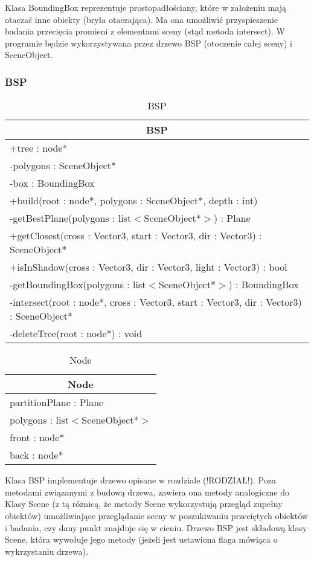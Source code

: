 Klasa BoundingBox reprezentuje prostopadłościany, które w założeniu mają otaczać inne obiekty (bryła otaczająca). Ma ona umożliwić przyspieszenie badania przecięcia promieni z elementami sceny (stąd metoda intersect). W programie będzie wykorzystywana przez drzewo BSP (otoczenie całej sceny) i SceneObject. 


\subsubsection{BSP}

\footnotesize
\begin{longtable}{|p{14cm}|}
	\caption{BSP} \label{tab:BSP} \\ \hline
	\multicolumn{1}{|c|}{BSP} \\ \hline
    +tree : node* \\
    -polygons : SceneObject* \\
    -box : BoundingBox \\ \hline
    +build(root : node*, polygons : SceneObject*, depth : int) \\ 
	-getBestPlane(polygons : list$<$SceneObject*$>$) : Plane \\
	+getClosest(cross : Vector3, start : Vector3, dir : Vector3) : SceneObject* \\
	+isInShadow(cross : Vector3, dir : Vector3, light : Vector3) : bool \\
	-getBoundingBox(polygons : list$<$SceneObject*$>$) : BoundingBox \\
	-intersect(root : node*, cross : Vector3, start : Vector3, dir : Vector3) : SceneObject* \\
	-deleteTree(root : node*) : void \\
    \hline
\end{longtable}
\normalsize

\footnotesize
\begin{longtable}{|p{14cm}|}
    \caption{Node} \label{tab:Node (struktura)} \\ \hline
    \multicolumn{1}{|c|}{Node} \\ \hline
    partitionPlane : Plane \\
    polygons : list$<$SceneObject*$>$ \\
    front : node*  \\
    back : node*  \\ \hline
\end{longtable}
\normalsize

Klasa BSP implementuje drzewo opisane w rozdziale (!RODZIAŁ!). Poza metodami związanymi z budową drzewa, zawiera ona metody analogiczne do Klasy Scene (z tą różnicą, że metody Scene wykorzystują przegląd zupełny obiektów) umożliwiające przeglądanie sceny w poszukiwaniu przeciętych obiektów i badania, czy dany punkt znajduje się w cieniu. Drzewo BSP jest składową klasy Scene, która wywołuje jego metody (jeżeli jest ustawiona flaga mówiąca o wykrzystaniu drzewa).


